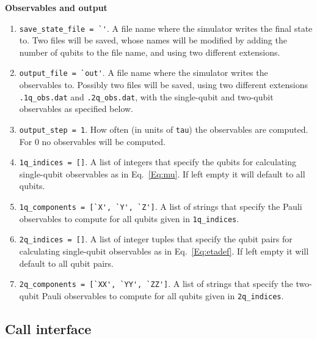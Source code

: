 \documentclass[aps,10pt,pra,twocolumn,groupedaddress,floatfix,superscriptaddress,showpacs,showkeys,amsfonts]{revtex4-2}
\newcommand{\eq}[1]{Eq.~\eqref{#1}}
\begin{document}
\noindent \textbf{Observables and output}
\begin{enumerate}
\item \verb|save_state_file = `'|. A file name where the simulator writes the final state to. Two files will be saved, whose names will be modified by adding the number of qubits to the file name, and using two different extensions.
\item \verb|output_file = `out'|. A file name where the simulator writes the observables to. Possibly two files will be saved, using two different extensions \verb|.1q_obs.dat| and \verb|.2q_obs.dat|, with the single-qubit and two-qubit observables as specified below.
\item \verb|output_step = 1|. How often (in units of \verb|tau|) the observables are computed. For 0 no observables will be computed.
\item \verb|1q_indices = []|. A list of integers that specify the qubits for calculating single-qubit observables as in \eq{Eq:mu}. If left empty it will default to all qubits. 
\item \verb|1q_components = [`X', `Y', `Z']|. A list of strings that specify the Pauli observables to compute for all qubits given in \verb|1q_indices|.
\item \verb|2q_indices = []|. A list of integer tuples that specify the qubit pairs for calculating single-qubit observables as in \eq{Eq:etadef}. If left empty it will default to all qubit pairs.
\item \verb|2q_components = [`XX', `YY', `ZZ']|. A list of strings that specify the two-qubit Pauli observables to compute for all qubits given in \verb|2q_indices|.
\end{enumerate}

\subsection{Call interface}
\end{document}

